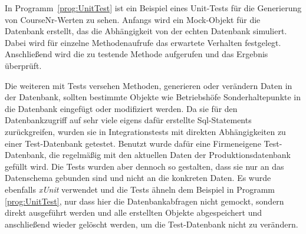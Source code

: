     In Programm~\ref{prog:UnitTest} ist ein Beispiel eines Unit-Tests für die Generierung von CourseNr-Werten zu sehen. 
    Anfangs wird ein Mock-Objekt für die Datenbank erstellt, das die Abhängigkeit von der echten Datenbank simuliert. Dabei wird für 
    einzelne Methodenaufrufe das erwartete Verhalten festgelegt. Anschließend wird die zu testende Methode aufgerufen und das Ergebnis überprüft.

    Die weiteren mit Tests versehen Methoden, generieren oder verändern Daten in der Datenbank, sollten bestimmte Objekte wie Betriebshöfe Sonderhaltepunkte in die
    Datenbank eingefügt oder modifiziert werden. Da sie für den Datenbankzugriff auf sehr viele eigens dafür erstellte Sql-Statements zurückgreifen, wurden sie in Integrationstests 
    mit direkten Abhängigkeiten zu einer Test-Datenbank getestet. Benutzt wurde dafür eine Firmeneigene Test-Datenbank, die regelmäßig mit den aktuellen Daten der Produktionsdatenbank gefüllt wird.
    Die Tests wurden aber dennoch so gestalten, dass sie nur an das Datenschema gebunden sind und nicht an die konkreten Daten.
    Es wurde ebenfalls \emph{xUnit} verwendet und die Tests ähneln dem Beispiel in Programm \ref{prog:UnitTest}, nur dass hier die Datenbankabfragen nicht gemockt, sondern 
    direkt ausgeführt werden und alle erstellten Objekte abgespeichert und anschließend wieder gelöscht werden, um die Test-Datenbank nicht zu verändern.